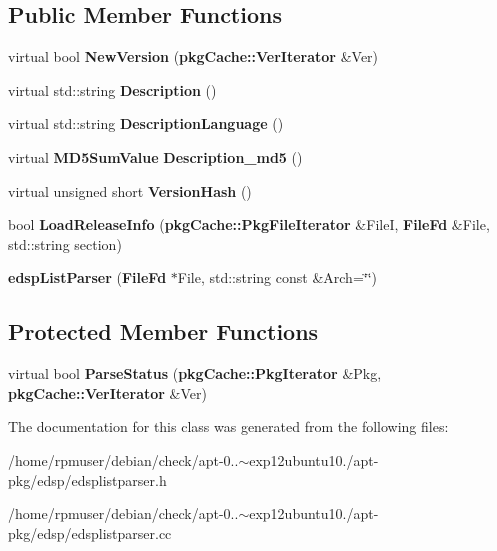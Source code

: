 \subsection*{\-Public \-Member \-Functions}
\begin{DoxyCompactItemize}
\item 
virtual bool {\bfseries \-New\-Version} ({\bf pkg\-Cache\-::\-Ver\-Iterator} \&\-Ver)\label{classedspListParser_ab0739a9acf5509c3381d49350f6c4cc0}

\item 
virtual std\-::string {\bfseries \-Description} ()\label{classedspListParser_a36dad231a3b906d97848a420bb61d8f4}

\item 
virtual std\-::string {\bfseries \-Description\-Language} ()\label{classedspListParser_ae3d7cf766ece0343b77c137a44014bb3}

\item 
virtual {\bf \-M\-D5\-Sum\-Value} {\bfseries \-Description\-\_\-md5} ()\label{classedspListParser_af6e909cae5e99d04567e77aade983b66}

\item 
virtual unsigned short {\bfseries \-Version\-Hash} ()\label{classedspListParser_a1817727f21ff86bb623fd169cd4bcee0}

\item 
bool {\bfseries \-Load\-Release\-Info} ({\bf pkg\-Cache\-::\-Pkg\-File\-Iterator} \&\-File\-I, {\bf \-File\-Fd} \&\-File, std\-::string section)\label{classedspListParser_a045594301522e29d4764ab65e214b727}

\item 
{\bfseries edsp\-List\-Parser} ({\bf \-File\-Fd} $\ast$\-File, std\-::string const \&\-Arch=\char`\"{}\char`\"{})\label{classedspListParser_aa3fb5c430287580927ed755061a3a3f3}

\end{DoxyCompactItemize}
\subsection*{\-Protected \-Member \-Functions}
\begin{DoxyCompactItemize}
\item 
virtual bool {\bfseries \-Parse\-Status} ({\bf pkg\-Cache\-::\-Pkg\-Iterator} \&\-Pkg, {\bf pkg\-Cache\-::\-Ver\-Iterator} \&\-Ver)\label{classedspListParser_a0086e995b5bccf24c99c487d5081f3f2}

\end{DoxyCompactItemize}


\-The documentation for this class was generated from the following files\-:\begin{DoxyCompactItemize}
\item 
/home/rpmuser/debian/check/apt-\/0..$\sim$exp12ubuntu10./apt-\/pkg/edsp/edsplistparser.\-h\item 
/home/rpmuser/debian/check/apt-\/0..$\sim$exp12ubuntu10./apt-\/pkg/edsp/edsplistparser.\-cc\end{DoxyCompactItemize}
